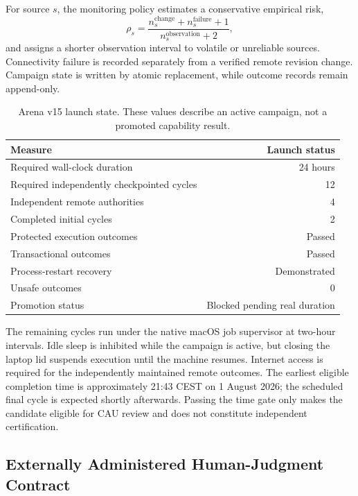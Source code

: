For source $s$, the monitoring policy estimates a conservative empirical risk,
\begin{equation}
 \rho_s=\frac{n^{\mathrm{change}}_s+n^{\mathrm{failure}}_s+1}
 {n^{\mathrm{observation}}_s+2},
\end{equation}
and assigns a shorter observation interval to volatile or unreliable sources.
Connectivity failure is recorded separately from a verified remote revision
change.  Campaign state is written by atomic replacement, while outcome
records remain append-only.

\begin{table}[htbp]
\centering
\caption{Arena v15 launch state.  These values describe an active campaign,
not a promoted capability result.}
\label{tab:arena-v15-launch}
\begin{tabular}{lr}
\hline
Measure & Launch status \\
\hline
Required wall-clock duration & 24 hours \\
Required independently checkpointed cycles & 12 \\
Independent remote authorities & 4 \\
Completed initial cycles & 2 \\
Protected execution outcomes & Passed \\
Transactional outcomes & Passed \\
Process-restart recovery & Demonstrated \\
Unsafe outcomes & 0 \\
Promotion status & Blocked pending real duration \\
\hline
\end{tabular}
\end{table}

The remaining cycles run under the native macOS job supervisor at two-hour
intervals.  Idle sleep is inhibited while the campaign is active, but closing
the laptop lid suspends execution until the machine resumes.  Internet access
is required for the independently maintained remote outcomes.  The earliest
eligible completion time is approximately 21:43 CEST on 1 August 2026; the
scheduled final cycle is expected shortly afterwards.  Passing the time gate
only makes the candidate eligible for CAU review and does not constitute
independent certification.

\subsection{Externally Administered Human-Judgment Contract}
\label{subsec:v15-human-authority}

